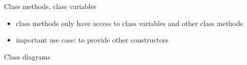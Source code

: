 \begin{frame}{Class methods, class variables}
	\begin{itemize}
		\item class methods only have access to class variables and other class methods
		\item important use case: to provide other constructors
	\end{itemize}
\end{frame}

\begin{frame}{Class diagrams}
	
\end{frame}
